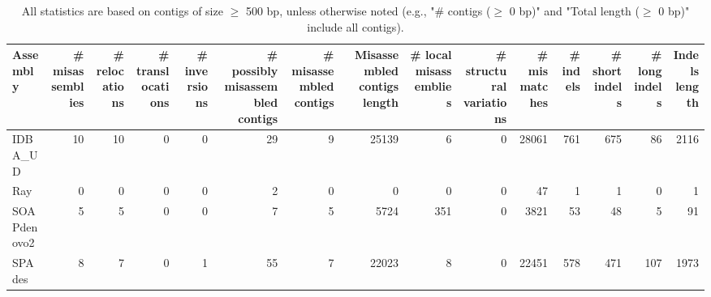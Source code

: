 \documentclass[12pt,a4paper]{article}
\begin{document}
\begin{table}[ht]
\begin{center}
\caption{All statistics are based on contigs of size $\geq$ 500 bp, unless otherwise noted (e.g., "\# contigs ($\geq$ 0 bp)" and "Total length ($\geq$ 0 bp)" include all contigs).}
\begin{tabular}{|l*{14}{|r}|}
\hline
Assembly & \# misassemblies &     \# relocations &     \# translocations &     \# inversions & \# possibly misassembled contigs & \# misassembled contigs & Misassembled contigs length & \# local misassemblies & \# structural variations & \# mismatches & \# indels &     \# short indels &     \# long indels & Indels length \\ \hline
IDBA\_UD & 10 & 10 & 0 & 0 & 29 & 9 & 25139 & 6 & 0 & 28061 & 761 & 675 & 86 & 2116 \\ \hline
Ray & 0 & 0 & 0 & 0 & 2 & 0 & 0 & 0 & 0 & 47 & 1 & 1 & 0 & 1 \\ \hline
SOAPdenovo2 & 5 & 5 & 0 & 0 & 7 & 5 & 5724 & 351 & 0 & 3821 & 53 & 48 & 5 & 91 \\ \hline
SPAdes & 8 & 7 & 0 & 1 & 55 & 7 & 22023 & 8 & 0 & 22451 & 578 & 471 & 107 & 1973 \\ \hline
\end{tabular}
\end{center}
\end{table}
\end{document}
